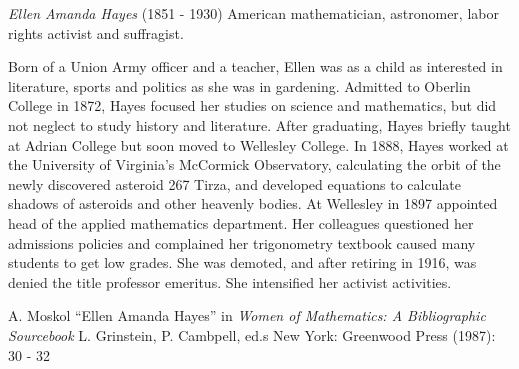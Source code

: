 \documentclass[12pt]{article}
\begin{document}

\emph{Ellen Amanda Hayes} (1851 - 1930) American mathematician, astronomer, labor rights activist and suffragist.

Born of a Union Army officer and a teacher, Ellen was as a child as interested in literature, sports and politics as she was in gardening. Admitted to Oberlin College in 1872, Hayes focused her studies on science and mathematics, but did not neglect to study history and literature. After graduating, Hayes briefly taught at Adrian College but soon moved to Wellesley College. In 1888, Hayes worked at the University of Virginia's McCormick Observatory, calculating the orbit of the newly discovered asteroid 267 Tirza, and developed equations to calculate shadows of asteroids and other heavenly bodies. At Wellesley in 1897 appointed head of the applied mathematics department. Her colleagues questioned her admissions policies and complained her trigonometry textbook caused many students to get low grades. She was demoted, and after retiring in 1916, was denied the title professor emeritus. She intensified her activist activities.

\begin{thebibliography}{1}
 A. Moskol ``Ellen Amanda Hayes'' in {\it Women of Mathematics: A Bibliographic Sourcebook} L. Grinstein, P. Cambpell, ed.s New York: Greenwood Press (1987): 30 - 32
\end{thebibliography}
\end{document}
